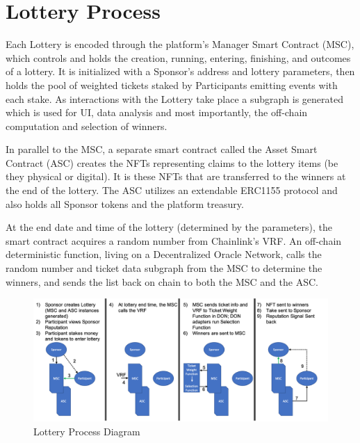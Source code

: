 \documentclass[runningheads]{llncs}
\begin{document}
\section{Lottery Process}\label{section-LotteryProcess}
Each Lottery is encoded through the platform’s Manager Smart Contract (MSC), which controls and holds the creation, running, entering, finishing, and outcomes of a lottery.  It is initialized with a Sponsor’s address and lottery parameters, then holds the pool of weighted tickets staked by Participants emitting events with each stake.  As interactions with the Lottery take place a subgraph is generated which is used for UI, data analysis and most importantly, the off-chain computation and selection of winners.

In parallel to the MSC, a separate smart contract called the Asset Smart Contract (ASC) creates the NFTs representing claims to the lottery items (be they physical or digital).  It is these NFTs that are transferred to the winners at the end of the lottery.  The ASC utilizes an extendable ERC1155 protocol and also holds all Sponsor tokens and the platform treasury.

At the end date and time of the lottery (determined by the parameters), the smart contract acquires a random number from Chainlink’s VRF.  An off-chain deterministic function, living on a Decentralized Oracle Network, calls the random number and ticket data subgraph from the MSC to determine the winners, and sends the list back on chain to both the MSC and the ASC.

\begin{figure}[H]
\centering
\includegraphics[scale=0.4]{Figures_and_Tables/LotteryProcessDiagram.png}
\caption{Lottery Process Diagram}
\end{figure}
\end{document}
